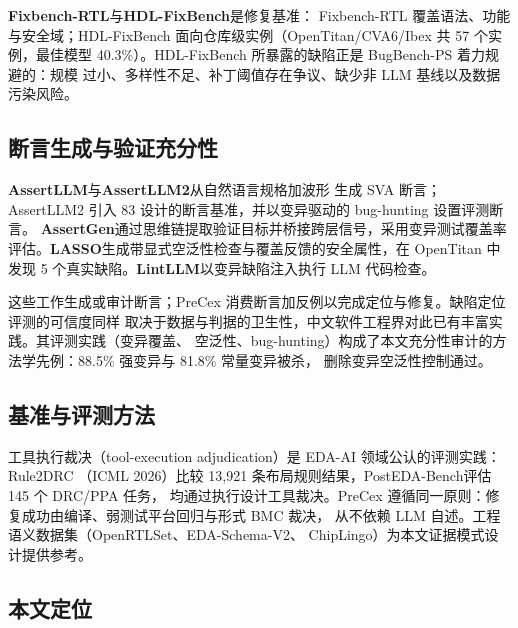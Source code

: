 \documentclass[twocolumn,10pt]{ctexart}
\begin{document}
\textbf{Fixbench-RTL}\cite{fixbench}与\textbf{HDL-FixBench}\cite{hdlfixbench}是修复基准：
Fixbench-RTL 覆盖语法、功能与安全域；HDL-FixBench 面向仓库级实例（OpenTitan/CVA6/Ibex 共
57 个实例，最佳模型 40.3\%）。HDL-FixBench 所暴露的缺陷正是 BugBench-PS 着力规避的：规模
过小、多样性不足、补丁阈值存在争议、缺少非 LLM 基线以及数据污染风险。

\subsection{断言生成与验证充分性}

\textbf{AssertLLM}\cite{assertllm}与\textbf{AssertLLM2}\cite{assertllm2}从自然语言规格加波形
生成 SVA 断言；AssertLLM2 引入 83 设计的断言基准，并以变异驱动的 bug-hunting 设置评测断言。
\textbf{AssertGen}\cite{assertgen}通过思维链提取验证目标并桥接跨层信号，采用变异测试覆盖率
评估。\textbf{LASSO}\cite{lasso}生成带显式空泛性检查与覆盖反馈的安全属性，在 OpenTitan 中
发现 5 个真实缺陷。\textbf{LintLLM}\cite{lintllm}以变异缺陷注入执行 LLM 代码检查。

这些工作生成或审计断言；PreCex 消费断言加反例以完成定位与修复。缺陷定位评测的可信度同样
取决于数据与判据的卫生性，中文软件工程界对此已有丰富实践\cite{zh4}。其评测实践（变异覆盖、
空泛性、bug-hunting）构成了本文充分性审计的方法学先例：88.5\% 强变异与 81.8\% 常量变异被杀，
删除变异空泛性控制通过。

\subsection{基准与评测方法}

工具执行裁决（tool-execution adjudication）是 EDA-AI 领域公认的评测实践：Rule2DRC\cite{rule2drc}
（ICML 2026）比较 13,921 条布局规则结果，PostEDA-Bench\cite{posteda}评估 145 个 DRC/PPA 任务，
均通过执行设计工具裁决。PreCex 遵循同一原则：修复成功由编译、弱测试平台回归与形式 BMC 裁决，
从不依赖 LLM 自述。工程语义数据集（OpenRTLSet\cite{openrtlset}、EDA-Schema-V2\cite{edaschema}、
ChipLingo\cite{chiplingo}）为本文证据模式设计提供参考。

\subsection{本文定位}
\end{document}
